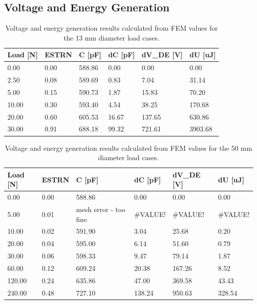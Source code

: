 \subsection{Voltage and Energy Generation}
\begin{table}[H]
	\centering
	\label{tab:volt-energy-gen-d13mm}
	\caption{Voltage and energy generation results calculated from FEM values for the 13 mm diameter load cases.}
	\vspace{0.3cm}
	\begin{tabular}{llllll}
		\textbf{Load {[}N{]}} & \textbf{ESTRN} & \textbf{C {[}pF{]}} & \textbf{dC {[}pF{]}} & \textbf{dV\_DE {[}V{]}} & \textbf{dU {[}uJ{]}} \\ \hline
		0.00  & 0.00 & 588.86 & 0.00  & 0.00   & 0.00    \\
		2.50  & 0.08 & 589.69 & 0.83  & 7.04   & 31.14   \\
		5.00  & 0.15 & 590.73 & 1.87  & 15.83  & 70.20   \\
		10.00 & 0.30 & 593.40 & 4.54  & 38.25  & 170.68  \\
		20.00 & 0.60 & 605.53 & 16.67 & 137.65 & 630.86  \\
		30.00 & 0.91 & 688.18 & 99.32 & 721.61 & 3903.68
	\end{tabular}
\end{table}


\begin{table}[H]
	\centering
	\label{tab:volt-energy-gen-150m}
	\caption{Voltage and energy generation results calculated from FEM values for the 50 mm diameter load cases.}
	\vspace{0.3cm}
	\begin{tabular}{llllll}
		\textbf{Load {[}N{]}} & \textbf{ESTRN} & \textbf{C {[}pF{]}} & \textbf{dC {[}pF{]}} & \textbf{dV\_DE {[}V{]}} & \textbf{dU {[}uJ{]}} \\ \hline
		0.00 & 0.00 & 588.86 & 0.00 & 0.00 & 0.00 \\
		5.00 & 0.01 & mesh   error - too fine & \#VALUE! & \#VALUE! & \#VALUE! \\
		10.00 & 0.02 & 591.90 & 3.04 & 25.68 & 0.20 \\
		20.00 & 0.04 & 595.00 & 6.14 & 51.60 & 0.79 \\
		30.00 & 0.06 & 598.33 & 9.47 & 79.14 & 1.87 \\
		60.00 & 0.12 & 609.24 & 20.38 & 167.26 & 8.52 \\
		120.00 & 0.24 & 635.86 & 47.00 & 369.58 & 43.43 \\
		240.00 & 0.48 & 727.10 & 138.24 & 950.63 & 328.54
	\end{tabular}
\end{table}


